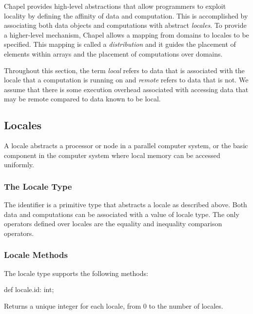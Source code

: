 \label{Locality_and_Distribution}

Chapel provides high-level abstractions that allow programmers to
exploit locality by defining the affinity of data and computation.
This is accomplished by associating both data objects and computations
with abstract {\em locales}. To provide a higher-level mechanism,
Chapel allows a mapping from domains to locales to be specified. This
mapping is called a {\em distribution} and it guides the placement of
elements within arrays and the placement of computations over domains.

Throughout this section, the term {\em local} refers to data that is
associated with the locale that a computation is running on and {\em
remote} refers to data that is not. We assume that there is some
execution overhead associated with accessing data that may be remote
compared to data known to be local.

\subsection{Locales}
\label{Locales}

A locale abstracts a processor or node in a parallel computer system,
or the basic component in the computer system where local memory can
be accessed uniformly.

\subsubsection{The Locale Type}
\label{The_Locale_Type}

The identifier  is a primitive type that abstracts a
locale as described above.  Both data and computations can be
associated with a value of locale type. The only operators defined
over locales are the equality and inequality comparison operators.

\subsubsection{Locale Methods}
\label{Locale_Methods}

The locale type supports the following methods:

\begin{protohead}
def locale.id: int;
\end{protohead}
\begin{protobody}
Returns a unique integer for each locale, from 0 to the number of
locales.
\end{protobody}

